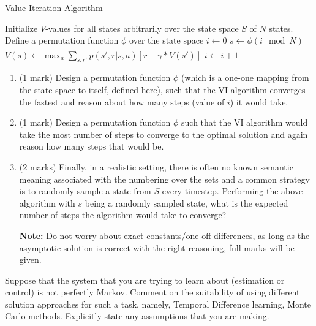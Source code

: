 \documentclass[addpoints,12pt,solution]{exam}
\begin{document}
\begin{questions}
\begin{algorithm}
\caption{Value Iteration Algorithm}
\begin{algorithmic}[1]
    \State Initialize $V$-values for all states arbitrarily over the state space $S$ of $N$ states. Define a permutation function $\phi$ over the state space
    \State $i \xleftarrow[]{} 0$
    \State $s \xleftarrow[]{} \phi(i \mod N)$
    \State $V(s) \xleftarrow[]{} \max_a \sum_{s, r'} p(s', r|s, a)[r + \gamma*V(s')]$
    \State $i \xleftarrow{} i + 1$
    \EndWhile

\end{algorithmic}
\end{algorithm}
\begin{enumerate}
    \item (1 mark) Design a permutation function $\phi$ (which is a one-one mapping from the state space to itself, defined \href{https://en.wikipedia.org/wiki/Permutation#Definition}{here}), such that the VI algorithm converges the fastest and reason about how many steps (value of $i$) it would take.
    \begin{solution}
        
    \end{solution}
    \item (1 mark) Design a permutation function $\phi$ such that the VI algorithm would take the most number of steps to converge to the optimal solution and again reason how many steps that would be.
    \begin{solution}
        
    \end{solution}
    \item (2 marks) 
    Finally, in a realistic setting, there is often no known semantic meaning associated with the numbering over the sets and a common strategy is to randomly sample a state from $S$ every timestep. Performing the above algorithm with $s$ being a randomly sampled state, what is the expected number of steps the algorithm would take to converge?
    \begin{solution}
        
    \end{solution}
    \textbf{Note:} Do not worry about exact constants/one-off differences, as long as the asymptotic solution is correct with the right reasoning, full marks will be given. 
\end{enumerate}

\question[5] [TD, MC] Suppose that the system that you are trying to learn about (estimation or control) is not perfectly Markov. Comment on the suitability of using different solution approaches for such a task, namely, Temporal Difference learning, Monte Carlo methods. Explicitly state any assumptions that you are making.
\begin{solution}


\end{solution}
\end{questions}
\end{document}
